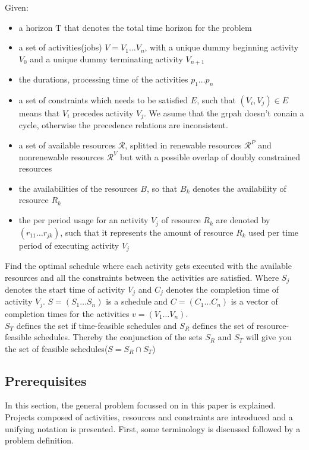\documentclass{article}
\begin{document}
Given:
\begin{itemize}
\item a horizon T that denotes the total time horizon for the problem
\item a set of activities(jobs) $V = V_1 \ldots V_n$, with a unique dummy beginning activity $V_0$ and a unique dummy terminating activity $V_{n+1}$
\item the durations, processing time of the activities $p_1\ldots p_n$
\item a set of constraints which needs to be satisfied $E$, such that $(V_i,V_j) \in E$ means that $V_i$ precedes activity $V_j$. We asume that the grpah doesn't conain a cycle, otherwise the precedence relations are inconsistent.
\item a set of available resources $\mathcal{R}$, splitted in renewable resources $\mathcal{R}^P$ and nonrenewable resources $\mathcal{R}^V$ but with a possible overlap of doubly constrained resources
\item the availabilities of the resources $B$, so that $B_k$ denotes the availability of resource $R_k$
\item the per period usage for an activity $V_j$ of resource $R_k$ are denoted by $(r_{11}\ldots r_{jk})$, such that it represents the amount of resource $R_k$ used per time period of executing activity $V_j$
\end{itemize}

Find the optimal schedule where each activity gets executed with the available resources and all the constraints between the activities are satisfied. Where $S_j$ denotes the start time of activity $V_j$ and $C_j$ denotes the completion time of activity $V_j$. $S = (S_1 \ldots S_n)$ is a schedule and $C = (C_1 \ldots C_n)$ is a vector of completion times for the activities $v = (V_1 \ldots V_n)$. \\
$S_T$ defines the set if time-feasible schedules and $S_R$ defines the set of resource-feasible schedules. Thereby the conjunction of the sets $S_R$ and $S_T$ will give you the set of feasible schedules($S = S_R \cap S_T$)

\subsection{Prerequisites}
In this section, the general problem focussed on in this paper is explained. Projects composed of activities, resources and constraints are introduced and a unifying notation is presented. First, some terminology is discussed followed by a problem definition.
\end{document}
